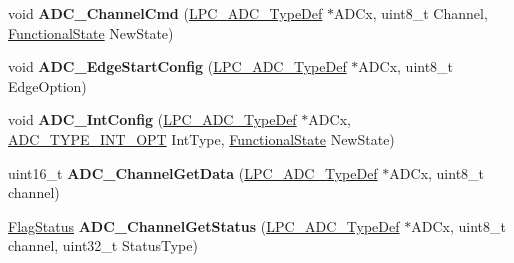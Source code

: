 \begin{DoxyCompactItemize}
\item 
\hypertarget{group___a_d_c___public___functions_gac59b7d9bf60e7cd0e83bac8e0fb4657c}{void {\bfseries \-A\-D\-C\-\_\-\-Channel\-Cmd} (\hyperlink{struct_l_p_c___a_d_c___type_def}{\-L\-P\-C\-\_\-\-A\-D\-C\-\_\-\-Type\-Def} $\ast$\-A\-D\-Cx, uint8\-\_\-t \-Channel, \hyperlink{group___l_p_c___types___public___types_gac9a7e9a35d2513ec15c3b537aaa4fba1}{\-Functional\-State} \-New\-State)}\label{group___a_d_c___public___functions_gac59b7d9bf60e7cd0e83bac8e0fb4657c}

\item 
\hypertarget{group___a_d_c___public___functions_gad10189df1242c1491192f763b7a58e87}{void {\bfseries \-A\-D\-C\-\_\-\-Edge\-Start\-Config} (\hyperlink{struct_l_p_c___a_d_c___type_def}{\-L\-P\-C\-\_\-\-A\-D\-C\-\_\-\-Type\-Def} $\ast$\-A\-D\-Cx, uint8\-\_\-t \-Edge\-Option)}\label{group___a_d_c___public___functions_gad10189df1242c1491192f763b7a58e87}

\item 
\hypertarget{group___a_d_c___public___functions_ga96740e60124bcd6beeb7ba865fafef81}{void {\bfseries \-A\-D\-C\-\_\-\-Int\-Config} (\hyperlink{struct_l_p_c___a_d_c___type_def}{\-L\-P\-C\-\_\-\-A\-D\-C\-\_\-\-Type\-Def} $\ast$\-A\-D\-Cx, \hyperlink{group___a_d_c___public___types_gae7fc3523a8faf7363895609c07aba95b}{\-A\-D\-C\-\_\-\-T\-Y\-P\-E\-\_\-\-I\-N\-T\-\_\-\-O\-P\-T} \-Int\-Type, \hyperlink{group___l_p_c___types___public___types_gac9a7e9a35d2513ec15c3b537aaa4fba1}{\-Functional\-State} \-New\-State)}\label{group___a_d_c___public___functions_ga96740e60124bcd6beeb7ba865fafef81}

\item 
\hypertarget{group___a_d_c___public___functions_ga7a2961a052fb215c081d88c71ac80234}{uint16\-\_\-t {\bfseries \-A\-D\-C\-\_\-\-Channel\-Get\-Data} (\hyperlink{struct_l_p_c___a_d_c___type_def}{\-L\-P\-C\-\_\-\-A\-D\-C\-\_\-\-Type\-Def} $\ast$\-A\-D\-Cx, uint8\-\_\-t channel)}\label{group___a_d_c___public___functions_ga7a2961a052fb215c081d88c71ac80234}

\item 
\hypertarget{group___a_d_c___public___functions_ga98b54a5834ffc73d5249682785af7c54}{\hyperlink{group___l_p_c___types___public___types_ga89136caac2e14c55151f527ac02daaff}{\-Flag\-Status} {\bfseries \-A\-D\-C\-\_\-\-Channel\-Get\-Status} (\hyperlink{struct_l_p_c___a_d_c___type_def}{\-L\-P\-C\-\_\-\-A\-D\-C\-\_\-\-Type\-Def} $\ast$\-A\-D\-Cx, uint8\-\_\-t channel, uint32\-\_\-t \-Status\-Type)}\label{group___a_d_c___public___functions_ga98b54a5834ffc73d5249682785af7c54}


\end{DoxyCompactItemize}
